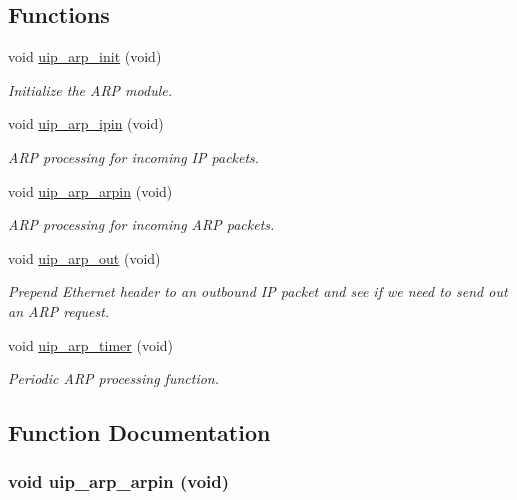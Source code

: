 \subsection*{Functions}
\begin{CompactItemize}
\item 
\hypertarget{a00067_g2d9d28afa353f662b9bb5234fc419f72}{
void \hyperlink{a00067_g2d9d28afa353f662b9bb5234fc419f72}{uip\_\-arp\_\-init} (void)}
\label{a00067_g2d9d28afa353f662b9bb5234fc419f72}

\begin{CompactList}\small\item\em Initialize the ARP module. \item\end{CompactList}\item 
void \hyperlink{a00067_g5cf8d6974a89ad67c5faf9b19261cb7c}{uip\_\-arp\_\-ipin} (void)
\begin{CompactList}\small\item\em ARP processing for incoming IP packets. \item\end{CompactList}\item 
void \hyperlink{a00067_g902c4a360134096224bc2655f623aa5f}{uip\_\-arp\_\-arpin} (void)
\begin{CompactList}\small\item\em ARP processing for incoming ARP packets. \item\end{CompactList}\item 
void \hyperlink{a00067_g54b27e45df15e10a0eb1a3e3a91417d2}{uip\_\-arp\_\-out} (void)
\begin{CompactList}\small\item\em Prepend Ethernet header to an outbound IP packet and see if we need to send out an ARP request. \item\end{CompactList}\item 
void \hyperlink{a00067_g058a8e6025f67b021862281f1911fcef}{uip\_\-arp\_\-timer} (void)
\begin{CompactList}\small\item\em Periodic ARP processing function. \item\end{CompactList}\end{CompactItemize}


\subsection{Function Documentation}
\hypertarget{a00067_g902c4a360134096224bc2655f623aa5f}{
\subsubsection[uip\_\-arp\_\-arpin]{\setlength{\rightskip}{0pt plus 5cm}void uip\_\-arp\_\-arpin (void)}}
\label{a00067_g902c4a360134096224bc2655f623aa5f}


